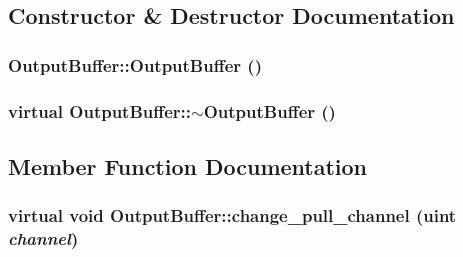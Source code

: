 \subsection{Constructor \& Destructor Documentation}
\hypertarget{classOutputBuffer_7a4352dc067a09bf7076bd7f8c6f6e1b}{
\subsubsection[{OutputBuffer}]{\setlength{\rightskip}{0pt plus 5cm}OutputBuffer::OutputBuffer ()}}
\label{classOutputBuffer_7a4352dc067a09bf7076bd7f8c6f6e1b}


\hypertarget{classOutputBuffer_928cc1b1e5cef13f3572c13775d547b5}{
\subsubsection[{$\sim$OutputBuffer}]{\setlength{\rightskip}{0pt plus 5cm}virtual OutputBuffer::$\sim$OutputBuffer ()}}
\label{classOutputBuffer_928cc1b1e5cef13f3572c13775d547b5}




\subsection{Member Function Documentation}
\hypertarget{classOutputBuffer_fb8e0a16f34dcff4c0d954201712f762}{
\subsubsection[{change\_\-pull\_\-channel}]{\setlength{\rightskip}{0pt plus 5cm}virtual void OutputBuffer::change\_\-pull\_\-channel ({\bf uint} {\em channel})}}
\label{classOutputBuffer_fb8e0a16f34dcff4c0d954201712f762}




